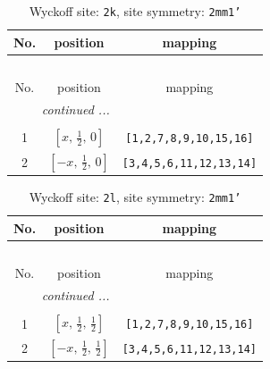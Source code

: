 \documentclass[fleqn,8pt]{jsarticle}
\begin{document}
\begin{longtable}{ccc}
\caption{Wyckoff site: {\tt 2k}, site symmetry: {\tt 2mm1'}}
 \\
 \hline \hline
No. & position & mapping \\ \hline \endfirsthead

\multicolumn{2}{l}{\tablename\ \thetable{}} \\
 \hline \hline
No. & position & mapping \\ \hline \endhead

 \hline \hline
\multicolumn{2}{r}{\footnotesize\it continued ...} \\ \endfoot

 \hline \hline
\multicolumn{2}{r}{} \\ \endlastfoot

1 & $\left[ x,\, \frac{1}{2},\, 0 \right]$ & {\tt [1,2,7,8,9,10,15,16]} \\ \hline
2 & $\left[ - x,\, \frac{1}{2},\, 0 \right]$ & {\tt [3,4,5,6,11,12,13,14]} \\
\end{longtable}
\renewcommand{\arraystretch}{1.2}
\begin{longtable}{ccc}
\caption{Wyckoff site: {\tt 2l}, site symmetry: {\tt 2mm1'}}
 \\
 \hline \hline
No. & position & mapping \\ \hline \endfirsthead

\multicolumn{2}{l}{\tablename\ \thetable{}} \\
 \hline \hline
No. & position & mapping \\ \hline \endhead

 \hline \hline
\multicolumn{2}{r}{\footnotesize\it continued ...} \\ \endfoot

 \hline \hline
\multicolumn{2}{r}{} \\ \endlastfoot

1 & $\left[ x,\, \frac{1}{2},\, \frac{1}{2} \right]$ & {\tt [1,2,7,8,9,10,15,16]} \\ \hline
2 & $\left[ - x,\, \frac{1}{2},\, \frac{1}{2} \right]$ & {\tt [3,4,5,6,11,12,13,14]} \\
\end{longtable}
\renewcommand{\arraystretch}{1.2}
\end{document}
